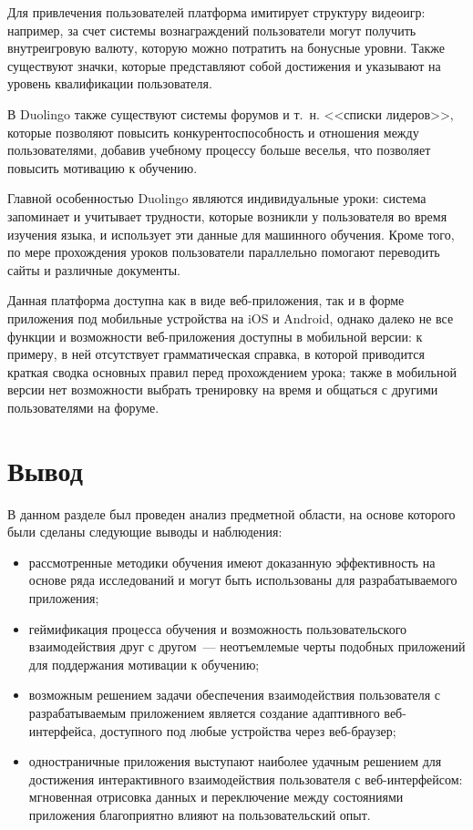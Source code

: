 Для привлечения пользователей платформа имитирует структуру видеоигр: например, за счет системы вознаграждений пользователи могут получить внутреигровую валюту, которую можно потратить на бонусные уровни. Также существуют значки, которые представляют собой достижения и указывают на уровень квалификации пользователя.

В Duolingo также существуют системы форумов и т.~н. <<списки лидеров>>, которые позволяют повысить конкурентоспособность и отношения между пользователями, добавив учебному процессу больше веселья, что позволяет повысить мотивацию к обучению.

Главной особенностью Duolingo являются индивидуальные уроки: система запоминает и учитывает трудности, которые возникли у пользователя во время изучения языка, и использует эти данные для машинного обучения. Кроме того, по мере прохождения уроков пользователи параллельно помогают переводить сайты и различные документы.

Данная платформа доступна как в виде веб-приложения, так и в форме приложения под мобильные устройства на iOS и Android, однако далеко не все функции и возможности веб-приложения доступны в мобильной версии: к примеру, в ней отсутствует грамматическая справка, в которой приводится краткая сводка основных правил перед прохождением урока; также в мобильной версии нет возможности выбрать тренировку на время и общаться с другими пользователями на форуме.

\section{Вывод}

В данном разделе был проведен анализ предметной области, на основе которого были сделаны следующие выводы и наблюдения:

\begin{itemize}
	\item рассмотренные методики обучения имеют доказанную эффективность на основе ряда исследований и могут быть использованы для разрабатываемого приложения;
	\item геймификация процесса обучения и возможность пользовательского взаимодействия друг с другом~--- неотъемлемые черты подобных приложений для поддержания мотивации к обучению;
	\item возможным решением задачи обеспечения взаимодействия пользователя с разрабатываемым приложением является создание адаптивного веб-интерфейса, доступного под любые устройства через веб-браузер;
	\item одностраничные приложения выступают наиболее удачным решением для достижения интерактивного взаимодействия пользователя с веб-интерфейсом: мгновенная отрисовка данных и переключение между состояниями приложения благоприятно влияют на пользовательский опыт.
\end{itemize}

